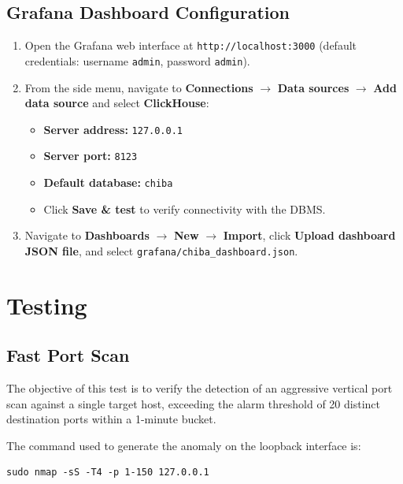 \documentclass[11pt,a4paper]{article}
\newenvironment{codebox}[1][]{%
    \begin{tcolorbox}[
        colback=codebg,
        colframe=codeframe,
        boxrule=0.6pt,
        arc=1.5mm,
        left=3mm,
        right=3mm,
        top=2mm,
        bottom=2mm,
        fonttitle=\sffamily\bfseries\footnotesize,
        coltitle=chibadark,
        colbacktitle=codeframe!50!white,
        #1
    ]
}{%
    \end{tcolorbox}
}
\begin{document}
\subsection{Grafana Dashboard Configuration}
\begin{enumerate}
    \item Open the Grafana web interface at \texttt{http://localhost:3000} (default credentials: username \texttt{admin}, password \texttt{admin}).
    \item From the side menu, navigate to \textbf{Connections} $\rightarrow$ \textbf{Data sources} $\rightarrow$ \textbf{Add data source} and select \textbf{ClickHouse}:
    \begin{itemize}
        \item \textbf{Server address:} \texttt{127.0.0.1}
        \item \textbf{Server port:} \texttt{8123}
        \item \textbf{Default database:} \texttt{chiba}
        \item Click \textbf{Save \& test} to verify connectivity with the DBMS.
    \end{itemize}
    \item Navigate to \textbf{Dashboards} $\rightarrow$ \textbf{New} $\rightarrow$ \textbf{Import}, click \textbf{Upload dashboard JSON file}, and select \texttt{grafana/chiba\_dashboard.json}.
\end{enumerate}

\section{Testing}

\subsection{Fast Port Scan}
The objective of this test is to verify the detection of an aggressive vertical port scan against a single target host, exceeding the alarm threshold of 20 distinct destination ports within a 1-minute bucket.

The command used to generate the anomaly on the loopback interface is:
\begin{codebox}[title={Fast Vertical Port Scan Simulation}]
\footnotesize
\begin{verbatim}
sudo nmap -sS -T4 -p 1-150 127.0.0.1
\end{verbatim}
\end{codebox}
\end{document}
